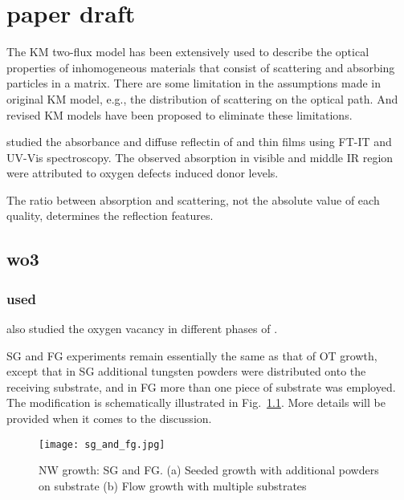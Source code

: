 \chapter{paper draft}

The KM two-flux model has been extensively used to describe the optical properties of inhomogeneous materials that consist of scattering and absorbing particles in a matrix.\cite{Vargas1997} There are some limitation in the assumptions made in original KM model, e.g., the distribution of scattering on the optical path. And revised KM models have been proposed to eliminate these limitations.\cite{Yang2004}  

\citeauthor{Morandi2005} studied the absorbance and diffuse reflectin of  and  thin films using FT-IT and UV-Vis spectroscopy. The observed absorption in visible and middle IR region were attributed to oxygen defects induced donor levels.\cite{Morandi2005}

The ratio between absorption and scattering, not the absolute value of each quality, determines the reflection features.


\section{wo3}

\subsection{used}

\citeauthor{Chatten2005} also studied the oxygen vacancy in different phases of .\cite{Chatten2005}


SG and FG experiments remain essentially the same as that of OT growth, except that in SG additional tungsten powders were distributed onto the receiving substrate, and in FG more than one piece of substrate was employed. The modification is schematically illustrated in Fig.~\ref{fig:wogrowsf}. More details will be provided when it comes to the discussion.
\begin{figure}[htb]
\centering
\texttt{[image: sg\_and\_fg.jpg]}
\caption[ NW growth: SG and FG]{ NW growth: SG and FG. (a) Seeded growth with additional powders on substrate (b) Flow growth with multiple substrates}
\label{fig:wogrowsf}
\end{figure}

